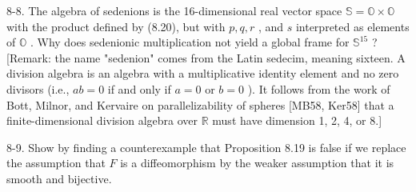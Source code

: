 \begin{exercise}
\label{prob:8-8}


8-8. The algebra of sedenions is the 16-dimensional real vector space $\mathbb{S} = \mathbb{O} \times  \mathbb{O}$ with the product defined by (8.20), but with $p, q, r$ , and $s$ interpreted as elements of $\mathbb{O}$ . Why does sedenionic multiplication not yield a global frame for ${\mathbb{S}}^{15}$ ? [Remark: the name "sedenion" comes from the Latin sedecim, meaning sixteen. A division algebra is an algebra with a multiplicative identity element and no zero divisors (i.e., ${ab} = 0$ if and only if $a = 0$ or $b = 0$ ). It follows from the work of Bott, Milnor, and Kervaire on parallelizability of spheres [MB58, Ker58] that a finite-dimensional division algebra over $\mathbb{R}$ must have dimension 1, 2, 4, or 8.]
\end{exercise}

\begin{exercise}
\label{prob:8-9}


8-9. Show by finding a counterexample that Proposition 8.19 is false if we replace the assumption that $F$ is a diffeomorphism by the weaker assumption that it is smooth and bijective.
\end{exercise}
